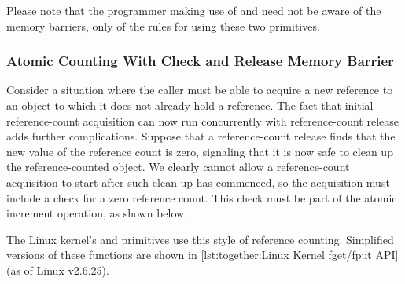 Please note that the programmer making use of  and
 need not be aware of the memory barriers, only
of the rules for using these two primitives.

\subsubsection{Atomic Counting With Check and Release Memory Barrier}
\label{sec:together:Atomic Counting With Check and Release Memory Barrier}

Consider a situation where the caller must be able to acquire a new
reference to an object to which it does not already hold a reference.
The fact that initial reference-count acquisition can now run concurrently
with reference-count release adds further complications.
Suppose that a reference-count release finds that the new
value of the reference count is zero, signaling that it is
now safe to clean up the reference-counted object.
We clearly cannot allow a reference-count acquisition to
start after such clean-up has commenced, so the acquisition
must include a check for a zero reference count.
This check must be part of the atomic increment operation,
as shown below.

\QuickQuizEnd

The Linux kernel's  and  primitives
use this style of reference counting.
Simplified versions of these functions are shown in
\cref{lst:together:Linux Kernel fget/fput API} (as of Linux v2.6.25).

